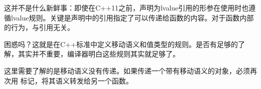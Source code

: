 这并不是什么新鲜事：即使在C++11之前，声明为lvalue引用的形参在使用时也遵循lvalue规则。关键是声明中的引用指定了可以传递给函数的内容。对于函数内部的行为，与引用无关。

困惑吗？这就是在C++标准中定义移动语义和值类型的规则。是否有足够的了解，其实并不重要，编译器明白这些规则其实就足够了。

这里需要了解的是移动语义没有传递。如果传递一个带有移动语义的对象，必须再次用  标记，将其语义转发给另一个函数。











































